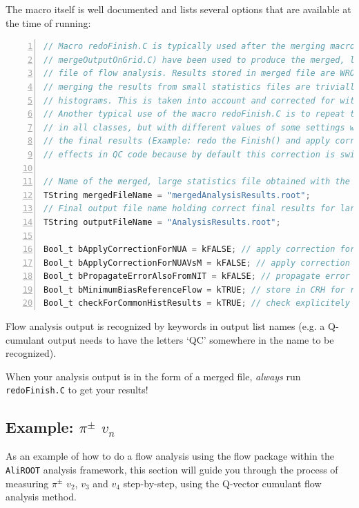 \documentclass[a4paper]{book}
\numberwithin{equation}{subsection}
\begin{document}
The macro itself is well documented and lists several options that are available at the time of running:
\begin{lstlisting}[language = C, numbers=left]
// Macro redoFinish.C is typically used after the merging macros (mergeOutput.C or
// mergeOutputOnGrid.C) have been used to produce the merged, large statistics
// file of flow analysis. Results stored in merged file are WRONG because after
// merging the results from small statistics files are trivially summed up in all
// histograms. This is taken into account and corrected for with macro redoFinish.C.
// Another typical use of the macro redoFinish.C is to repeat the call to Finish()
// in all classes, but with different values of some settings which might modify
// the final results (Example: redo the Finish() and apply correction for detector
// effects in QC code because by default this correction is switched off).

// Name of the merged, large statistics file obtained with the merging macros:
TString mergedFileName = "mergedAnalysisResults.root";
// Final output file name holding correct final results for large statistics sample:
TString outputFileName = "AnalysisResults.root";

Bool_t bApplyCorrectionForNUA = kFALSE; // apply correction for non-uniform acceptance
Bool_t bApplyCorrectionForNUAVsM = kFALSE; // apply correction for non-uniform acceptance in each multiplicity bin independently
Bool_t bPropagateErrorAlsoFromNIT = kFALSE; // propagate error also from non-isotropic terms
Bool_t bMinimumBiasReferenceFlow = kTRUE; // store in CRH for reference flow the result obtained wihout rebinning in multiplicity (kTRUE)
Bool_t checkForCommonHistResults = kTRUE; // check explicitely if the TList AliFlowCommonHistResults is available in the output\end{lstlisting}

Flow analysis output is recognized by keywords in output list names (e.g. a Q-cumulant output needs to have the letters `QC' somewhere in the name to be recognized). 

When your analysis output is in the form of a merged file, \emph{always} run \texttt{redoFinish.C} to get your results!

\subsection{Example: $\pi^{\pm}$ $v_n$}\label{sec:example}
As an example of how to do a flow analysis using the flow package within the \texttt{AliROOT} analysis framework, this section will guide you through the process of measuring $\pi^{\pm}$ $v_2$, $v_3$ and $v_4$ step-by-step, using the Q-vector cumulant flow analysis method. 
\end{document}
